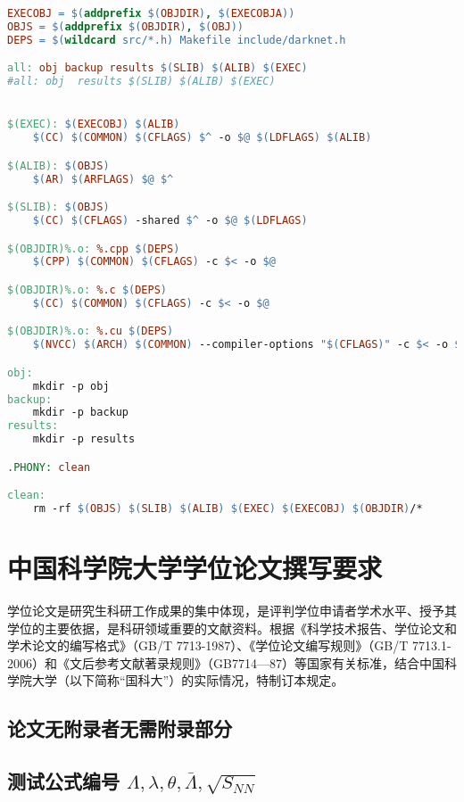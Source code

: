 \begin{lstlisting}[language=make]
EXECOBJ = $(addprefix $(OBJDIR), $(EXECOBJA))
OBJS = $(addprefix $(OBJDIR), $(OBJ))
DEPS = $(wildcard src/*.h) Makefile include/darknet.h

all: obj backup results $(SLIB) $(ALIB) $(EXEC)
#all: obj  results $(SLIB) $(ALIB) $(EXEC)


$(EXEC): $(EXECOBJ) $(ALIB)
    $(CC) $(COMMON) $(CFLAGS) $^ -o $@ $(LDFLAGS) $(ALIB)

$(ALIB): $(OBJS)
    $(AR) $(ARFLAGS) $@ $^

$(SLIB): $(OBJS)
    $(CC) $(CFLAGS) -shared $^ -o $@ $(LDFLAGS)

$(OBJDIR)%.o: %.cpp $(DEPS)
    $(CPP) $(COMMON) $(CFLAGS) -c $< -o $@

$(OBJDIR)%.o: %.c $(DEPS)
    $(CC) $(COMMON) $(CFLAGS) -c $< -o $@

$(OBJDIR)%.o: %.cu $(DEPS)
    $(NVCC) $(ARCH) $(COMMON) --compiler-options "$(CFLAGS)" -c $< -o $@

obj:
    mkdir -p obj
backup:
    mkdir -p backup
results:
    mkdir -p results

.PHONY: clean

clean:
    rm -rf $(OBJS) $(SLIB) $(ALIB) $(EXEC) $(EXECOBJ) $(OBJDIR)/*    
\end{lstlisting}
\chapter{中国科学院大学学位论文撰写要求}

学位论文是研究生科研工作成果的集中体现，是评判学位申请者学术水平、授予其学位的主要依据，是科研领域重要的文献资料。根据《科学技术报告、学位论文和学术论文的编写格式》（GB/T 7713-1987）、《学位论文编写规则》（GB/T 7713.1-2006）和《文后参考文献著录规则》（GB7714—87）等国家有关标准，结合中国科学院大学（以下简称“国科大”）的实际情况，特制订本规定。

\section{论文无附录者无需附录部分}

\section{测试公式编号 \texorpdfstring{$\Lambda,\lambda,\theta,\bar{\Lambda},\sqrt{S_{NN}}$}{$\textLambda,\textlambda,\texttheta,\bar{\textLambda},\sqrt{S_{NN}}$}} \label{sec:testmath}

